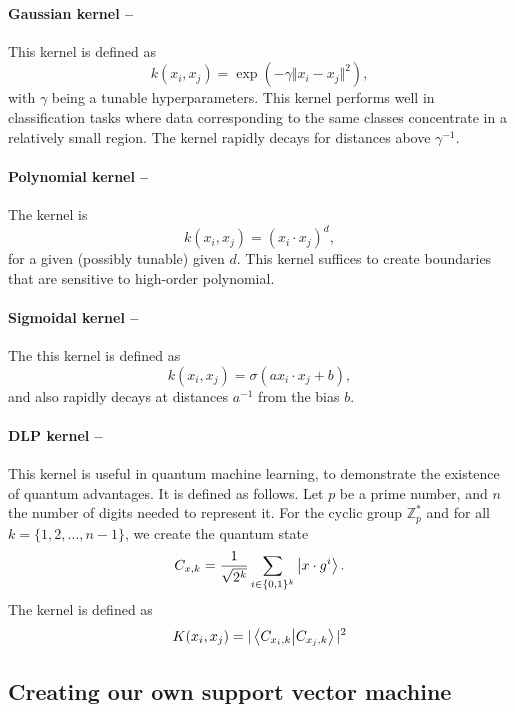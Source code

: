 \documentclass[]{report}
\begin{document}
\paragraph{Gaussian kernel --} This kernel is defined as
\begin{equation}
k(x_i, x_j) = \exp( - \gamma \Vert x_i - x_j\Vert^2), 
\end{equation}
with $\gamma$ being a tunable hyperparameters. This kernel performs well in classification tasks where data corresponding to the same classes concentrate in a relatively small region. The kernel rapidly decays for distances above $\gamma^{-1}$. 

\paragraph{Polynomial kernel --} The kernel is 
\begin{equation}
k(x_i, x_j) = (x_i \cdot x_j)^d, 
\end{equation}
for a given (possibly tunable) given $d$. This kernel suffices to create boundaries that are sensitive to high-order polynomial. 

\paragraph{Sigmoidal kernel --} The this kernel is defined as
\begin{equation}
k(x_i, x_j) = \sigma(a x_i \cdot x_j + b), 
\end{equation}
and also rapidly decays at distances $a^{-1}$ from the bias $b$. 

\paragraph{DLP kernel --} This kernel is useful in quantum machine learning, to demonstrate the existence of quantum advantages. It is defined as follows. Let $p$ be a prime number, and $n$ the number of digits needed to represent it. For the cyclic group $\mathbb Z^*_p$ and for all $k = \{1, 2, \ldots, n - 1\}$, we create the quantum state
\begin{equation}
C_{x, k} = \frac{1}{\sqrt{2^k}} \sum_{i \in \{0, 1\}^k} \ket{x \cdot g^i}.
\end{equation}
The kernel is defined as
\begin{equation}
K(x_i, x_j) = \vert \braket{C_{x_i, k}}{C_{x_j, k}} \vert^2
\end{equation}
\subsection{Creating our own support vector machine}
\end{document}
